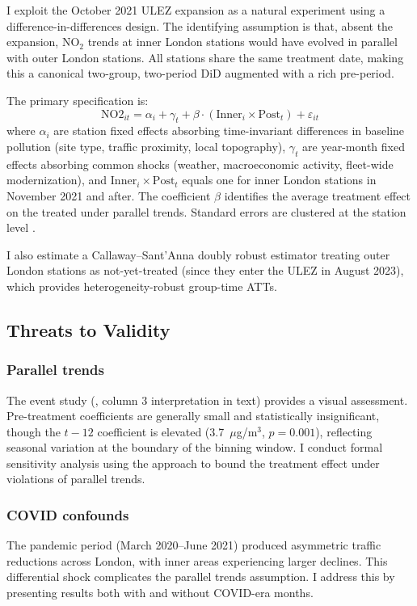 \documentclass[12pt]{article}
\begin{document}
I exploit the October 2021 ULEZ expansion as a natural experiment using a difference-in-differences design. The identifying assumption is that, absent the expansion, NO$_2$ trends at inner London stations would have evolved in parallel with outer London stations. All stations share the same treatment date, making this a canonical two-group, two-period DiD augmented with a rich pre-period.

The primary specification is:
\begin{equation}
\text{NO2}_{it} = \alpha_i + \gamma_t + \beta \cdot (\text{Inner}_i \times \text{Post}_t) + \varepsilon_{it}
\label{eq:did}
\end{equation}
where $\alpha_i$ are station fixed effects absorbing time-invariant differences in baseline pollution (site type, traffic proximity, local topography), $\gamma_t$ are year-month fixed effects absorbing common shocks (weather, macroeconomic activity, fleet-wide modernization), and $\text{Inner}_i \times \text{Post}_t$ equals one for inner London stations in November 2021 and after. The coefficient $\beta$ identifies the average treatment effect on the treated under parallel trends. Standard errors are clustered at the station level \citep{cameronMiller2015}.

I also estimate a Callaway--Sant'Anna \citep{callawaySantanna2021} doubly robust estimator treating outer London stations as not-yet-treated (since they enter the ULEZ in August 2023), which provides heterogeneity-robust group-time ATTs.

\subsection{Threats to Validity}

\subsubsection*{Parallel trends} The event study (, column 3 interpretation in text) provides a visual assessment. Pre-treatment coefficients are generally small and statistically insignificant, though the $t-12$ coefficient is elevated (3.7~$\mu$g/m$^3$, $p=0.001$), reflecting seasonal variation at the boundary of the binning window. I conduct formal sensitivity analysis using the \citet{rambachanRoth2023} approach to bound the treatment effect under violations of parallel trends.

\subsubsection*{COVID confounds} The pandemic period (March 2020--June 2021) produced asymmetric traffic reductions across London, with inner areas experiencing larger declines. This differential shock complicates the parallel trends assumption. I address this by presenting results both with and without COVID-era months.
\end{document}
